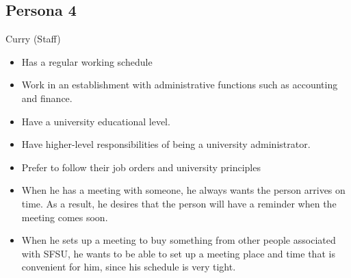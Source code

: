 \subsection{Persona 4}
\begin{description}[font=\bfseries\itshape]
\item[Actor:]Curry (Staff)
\item[About:]\hfill
\begin{itemize}[leftmargin=0mm]
\item Has a regular working schedule
\item Work in an establishment with administrative functions such as accounting and finance.
\item Have a university educational level.
\item Have higher-level responsibilities of being a university administrator.
\item Prefer to follow their job orders and university principles
\end{itemize}
\item[Goals \& Scenario:]\hfill
\begin{itemize}[leftmargin=0mm]
\item When he has a meeting with someone, he always wants the person arrives on time. As a result, he desires that the person will have a reminder when the meeting comes soon.
\item When he sets up a meeting to buy something from other people associated with SFSU, he wants to be able to set up a meeting place and time that is convenient for him, since his schedule is very tight.
\end{itemize}
\end{description}

